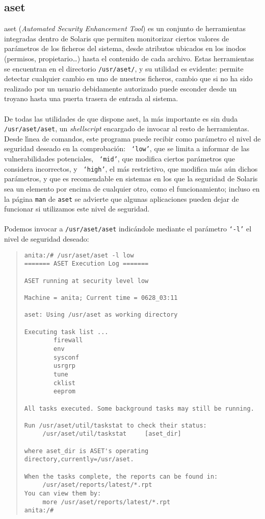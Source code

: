 \subsection{\sc aset}
{\sc aset} ({\it Automated Security Enhancement Tool}) es un conjunto de 
herramientas integradas dentro de Solaris que permiten monitorizar ciertos 
valores de par\'ametros de los ficheros del sistema, desde atributos ubicados en
los inodos (permisos, propietario\ldots) hasta el contenido de cada archivo. 
Estas herramientas se encuentran en el directorio {\tt /usr/aset/}, y su
utilidad es evidente: permite detectar cualquier cambio en uno de nuestros 
ficheros, cambio que si no ha sido realizado por un usuario debidamente 
autorizado puede esconder desde un troyano hasta una puerta trasera de entrada 
al sistema.\\
\\De todas las utilidades de que dispone {\sc aset}, la m\'as importante es
sin duda {\tt /usr/aset/aset}, un {\it shellscript} encargado de invocar al
resto de herramientas. Desde l\'{\i}nea de comandos, este programa puede recibir
como par\'ametro el nivel de seguridad deseado en la comprobaci\'on: {\tt 
`low'}, que se limita a informar de las vulnerabilidades potenciales, {\tt 
`mid'}, que modifica ciertos par\'ametros que considera incorrectos, y {\tt 
`high'}, el m\'as restrictivo, que modifica m\'as a\'un dichos par\'ametros, y
que es recomendable en sistemas en los que la seguridad de Solaris sea un 
elemento por encima de cualquier otro, como el funcionamiento; incluso en la
p\'agina {\tt man} de {\tt aset} se advierte que algunas aplicaciones pueden
dejar de funcionar si utilizamos este nivel de seguridad.\\
\\Podemos invocar a {\tt /usr/aset/aset} indic\'andole mediante el par\'ametro
{\tt `-l'} el nivel de seguridad deseado:
\begin{quote}
\begin{verbatim}
anita:/# /usr/aset/aset -l low
======= ASET Execution Log =======

ASET running at security level low

Machine = anita; Current time = 0628_03:11

aset: Using /usr/aset as working directory

Executing task list ...
        firewall
        env
        sysconf
        usrgrp
        tune
        cklist
        eeprom

All tasks executed. Some background tasks may still be running.

Run /usr/aset/util/taskstat to check their status:
     /usr/aset/util/taskstat     [aset_dir]

where aset_dir is ASET's operating directory,currently=/usr/aset.

When the tasks complete, the reports can be found in:
     /usr/aset/reports/latest/*.rpt
You can view them by:
     more /usr/aset/reports/latest/*.rpt
anita:/# 
\end{verbatim}
\end{quote}
